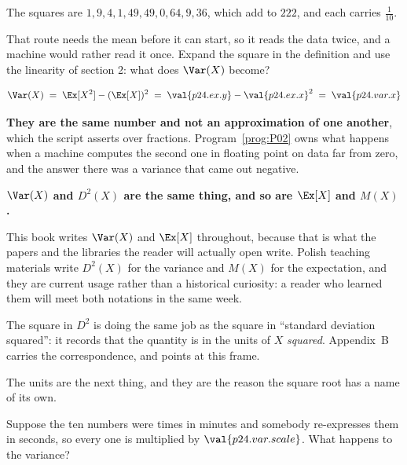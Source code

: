 \begin{fr}

The squares are $1, 9, 4, 1, 49, 49, 0, 64, 9, 36$, which add to $222$, and
each carries $\frac{1}{10}$.

That route needs the mean before it can start, so it reads the data twice, and
a machine would rather read it once. Expand the square in the definition and
use the linearity of section 2: what does $\Var(X)$ become?
\dotline
\nextframe
\end{fr}

\begin{fr}
\begin{ansblock}
\[ \Var(X) \;=\; \Ex[X^{2}] - (\Ex[X])^{2}
   \;=\; \val{p24.ex.y} - \val{p24.ex.x}^{2}
   \;=\; \val{p24.var.x} \]
\end{ansblock}

\textbf{They are the same number and not an approximation of one another},
which the script asserts over fractions. Program~\ref{prog:P02} owns what
happens when a machine computes the second one in floating point on data far
from zero, and the answer there was a variance that came out negative.
\end{fr}

\begin{fr}
\begin{notationbox}
\textbf{$\Var(X)$ and $D^{2}(X)$ are the same thing, and so are $\Ex[X]$ and
$M(X)$.}

This book writes $\Var(X)$ and $\Ex[X]$ throughout, because that is what the
papers and the libraries the reader will actually open write. Polish teaching
materials write $D^{2}(X)$ for the variance and $M(X)$ for the expectation,
and they are current usage rather than a historical curiosity: a reader who
learned them will meet both notations in the same week.

The square in $D^{2}$ is doing the same job as the square in
\enquote{standard deviation squared}: it records that the quantity is in the
units of $X$ \emph{squared}. Appendix~B carries the correspondence, and points
at this frame.
\end{notationbox}
\end{fr}

\begin{fr}
The units are the next thing, and they are the reason the square root has a
name of its own.

Suppose the ten numbers were times in minutes and somebody re-expresses them
in seconds, so every one is multiplied by $\val{p24.var.scale}$. What happens
to the variance?
\dotline
\nextframe
\end{fr}

